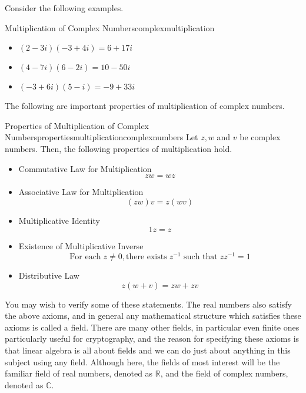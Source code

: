 Consider the following examples.

\begin{example}{Multiplication of Complex Numbers}{complexmultiplication}
\begin{itemize}
\item $(2-3i)(-3+4i) = 6+17i$
\item $(4-7i)(6-2i) = 10-50i$
\item $(-3+6i)(5-i) = -9+33i$
\end{itemize}
\end{example}

The following are important properties of multiplication of complex numbers.

\begin{theorem}{Properties of Multiplication of Complex Numbers}{propertiesmultiplicationcomplexnumbers}
Let $z,w$ and $v$ be complex numbers. Then, the following properties of multiplication hold.

\begin{itemize}

\item Commutative Law for Multiplication
\begin{equation*}
zw=wz
\end{equation*}

\item Associative Law for Multiplication
\begin{equation*}
\left( zw\right) v=z\left( wv\right) 
\end{equation*}

\item Multiplicative Identity
\begin{equation*}
1z=z
\end{equation*}

\item Existence of Multiplicative Inverse
\begin{equation*}
\mbox{For each}\; z\neq 0, \mbox{there exists}\; z^{-1} \mbox{ such that}\; zz^{-1}=1
\end{equation*}

\item Distributive Law
\begin{equation*}
z\left( w+v\right) =zw+zv
\end{equation*}
\end{itemize}
\end{theorem}

You may wish to verify some of these statements.  The real numbers
also satisfy the above axioms, and in general any mathematical
structure which satisfies these axioms is called a field. There are
many other fields, in particular even finite ones particularly useful
for cryptography, and the reason for specifying these axioms is that
linear algebra is all about fields and we can do just about anything
in this subject using any field. Although here, the fields of most
interest will be the familiar field of real numbers, denoted as
$\mathbb{R}$, and the field of complex numbers, denoted as
$\mathbb{C}$.

